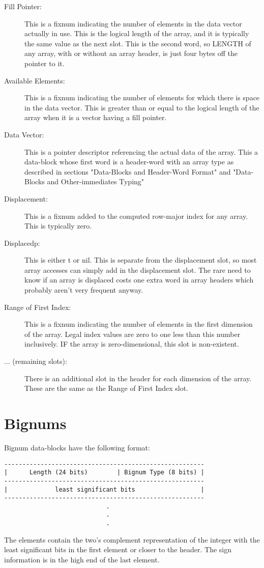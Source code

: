 \begin{description}
   \item[Fill Pointer:]
      This is a fixnum indicating the number of elements in the data vector
      actually in use.  This is the logical length of the array, and it is
      typically the same value as the next slot.  This is the second word, so
      LENGTH of any array, with or without an array header, is just four bytes
      off the pointer to it.
   \item[Available Elements:]
      This is a fixnum indicating the number of elements for which there is
      space in the data vector.  This is greater than or equal to the logical
      length of the array when it is a vector having a fill pointer.
   \item[Data Vector:]
      This is a pointer descriptor referencing the actual data of the array.
      This a data-block whose first word is a header-word with an array type as
      described in sections "Data-Blocks and Header-Word Format" and
      "Data-Blocks and Other-immediates Typing"
   \item[Displacement:]
      This is a fixnum added to the computed row-major index for any array.
      This is typically zero.
   \item[Displacedp:]
      This is either t or nil.  This is separate from the displacement slot, so
      most array accesses can simply add in the displacement slot.  The rare
      need to know if an array is displaced costs one extra word in array
      headers which probably aren't very frequent anyway.
   \item[Range of First Index:]
      This is a fixnum indicating the number of elements in the first dimension
      of the array.  Legal index values are zero to one less than this number
      inclusively.  IF the array is zero-dimensional, this slot is
      non-existent.
   \item[... (remaining slots):]
      There is an additional slot in the header for each dimension of the
      array.  These are the same as the Range of First Index slot.
\end{description}


\section{Bignums}

Bignum data-blocks have the following format:
\begin{verbatim}
-------------------------------------------------------
|      Length (24 bits)        | Bignum Type (8 bits) |
-------------------------------------------------------
|             least significant bits                  |
-------------------------------------------------------
                            .
                            .
                            .
\end{verbatim}
The elements contain the two's complement representation of the integer with
the least significant bits in the first element or closer to the header.  The
sign information is in the high end of the last element.



